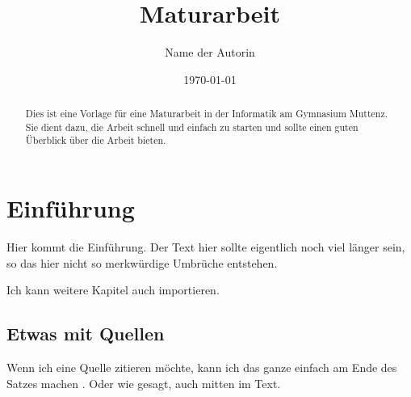 \documentclass[class=4Z,draft]{gymmureport}
\title{Maturarbeit}
\author{Name der Autorin}
\date{\today}
\begin{document}
\maketitle

\begin{abstract}
    Dies ist eine Vorlage für eine Maturarbeit in der Informatik am
    Gymnasium Muttenz. Sie dient dazu, die Arbeit schnell und einfach zu starten
    und sollte einen guten Überblick über die Arbeit bieten.
\end{abstract}

\tableofcontents

\chapter{Einführung}

Hier kommt die Einführung. Der Text hier
sollte eigentlich noch viel länger sein, so das hier nicht so merkwürdige
Umbrüche entstehen.

Ich kann weitere Kapitel auch importieren.



\section{Etwas mit Quellen}

Wenn ich eine Quelle zitieren möchte, kann ich das ganze einfach am Ende des
Satzes machen \citep{ai-wikipedia}. Oder wie gesagt, auch mitten im Text.

\printbibliography
\end{document}
